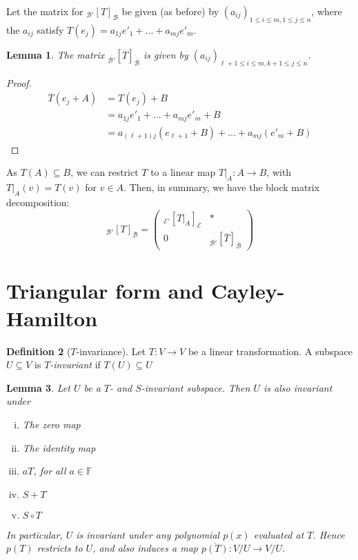 \documentclass[10pt,fleqn]{article}
\newcommand{\field}{\mathbb{F}}
\newcommand{\basis}{\mathcal{B}}
\newcommand{\varbasis}{\mathcal{E}}
\theoremstyle{definition} \newtheorem{defn}{Definition}[section]
\theoremstyle{plain}      \newtheorem{thm}[defn]{Theorem}
\theoremstyle{plain}      \newtheorem{prop}[defn]{Proposition}
\theoremstyle{plain}      \newtheorem{lem}[defn]{Lemma}
\theoremstyle{plain}      \newtheorem{cor}[defn]{Corollary}
\theoremstyle{plain}      \newtheorem{ad}[defn]{Addendum}
\theoremstyle{definition} \newtheorem{ex}[defn]{Example}
\theoremstyle{definition} \newtheorem{rem}[defn]{Remark}
\numberwithin{equation}{subsection}
\begin{document}
Let the matrix for $_{\basis'}[T]_{\basis}$ be given (as before) by $(a_{ij})_{1\leq i\leq m,1\leq j\leq n}$, where the $a_{ij}$ satisfy $T(e_j)=a_{1j}e'_1+\ldots+a_{mj}e'_m$.

\begin{lem}
    The matrix $_{\overline{\basis'}}[\overline{T}]_{\overline{\basis}}$ is given by $(a_{ij})_{\ell+1\leq i\leq m,k+1\leq j\leq n}$.
\end{lem}

\begin{proof}
    \begin{align*}
        \overline{T}(e_j+A)
        &=
        T(e_j)+B\\
        &=
        a_{1j}e'_1+\ldots+a_{mj}e'_m + B\\
        &=
        a_{(\ell+1)j}(e_{\ell+1}+B)+\ldots+a_{mj}(e'_m+B)
    \end{align*}
\end{proof}

As $T(A)\subseteq B$, we can restrict $T$ to a linear map $T|_A:A\to B$, with $T|_A(v)=T(v)$ for $v\in A$.
Then, in summary, we have the block matrix decomposition:
\begingroup
\renewcommand{\arraystretch}{2}
\[
    _{\basis'}[T]_{\basis}=
    \left(
    \begin{array}{c|c}
        _{\varbasis'}[T|_A]_{\varbasis} & *\\
        \hline
        0 & _{\overline{\basis'}}[\overline{T}]_{\overline{\basis}}
    \end{array}
    \right)
\]
\endgroup


\section{Triangular form and Cayley-Hamilton}

\begin{defn}[$T$-invariance]
    Let $T:V\to V$ be a linear transformation.
    A subspace $U\subseteq V$ is \emph{$T$-invariant} if $T(U)\subseteq U$
\end{defn}

\begin{lem}
    Let $U$ be a $T$- and $S$-invariant subspace.
    Then $U$ is also invariant under
    \begin{enumerate}[(i)]
        \item The zero map
        \item The identity map
        \item $aT$, for all $a\in\field$
        \item $S+T$
        \item $S\circ T$
    \end{enumerate}

    In particular, $U$ is invariant under any polynomial $p(x)$ evaluated at $T$.
    Hence $p(T)$ restricts to $U$, and also induces a map $\overline{p(T)}:V/U\to V/U$.
\end{lem}
\end{document}
